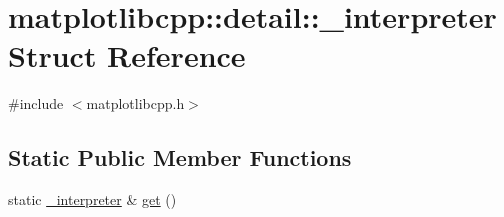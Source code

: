 \hypertarget{structmatplotlibcpp_1_1detail_1_1__interpreter}{}\section{matplotlibcpp\+:\+:detail\+:\+:\+\_\+interpreter Struct Reference}
\label{structmatplotlibcpp_1_1detail_1_1__interpreter}


{\ttfamily \#include $<$matplotlibcpp.\+h$>$}

\subsection*{Static Public Member Functions}
\begin{DoxyCompactItemize}
\item 
static \hyperlink{structmatplotlibcpp_1_1detail_1_1__interpreter}{\+\_\+interpreter} \& \hyperlink{structmatplotlibcpp_1_1detail_1_1__interpreter_a3ddc4e50c23738307da3dc64c47cdbc0}{get} ()
\end{DoxyCompactItemize}
